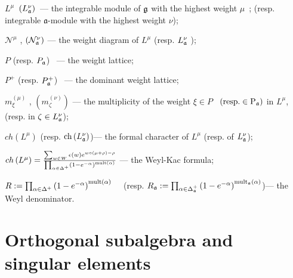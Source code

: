 \documentclass[12pt]{article}
\theoremstyle{definition}
\newcommand{\af}{\mathfrak{a}}
\begin{document}
$L^{\mu }$\ $\left( L_{\frak{a}}^{\nu }\right) $\ --- the integrable module
of $\frak{g}$ with the highest weight $\mu $\ ; (resp. integrable $\af$-module
with the highest weight $\nu $);

$\mathcal{N}^{\mu }$ , $\left( \mathcal{N}_{\frak{a}}^{\nu }\right) $ ---
the weight diagram of $L^{\mu }$ (resp. ${}L_{\frak{a}}^{\nu }$ );

$P$ (resp. $P_{\frak{a}} $) \ --- the weight lattice;

$P^{+}$ (resp. $P_{\frak{a}}^{+} $) \ --- the dominant weight lattice;

$m_{\xi }^{\left( \mu \right) }$ , $\left( m_{\zeta }^{\left( \nu \right)
}\right) $ --- the multiplicity of the weight $\xi \in P$ \ $\left( \mathrm{{%
resp. }\in P_{\frak{a}}}\right) $ in $L^{\mu }$, (resp. in $\zeta \in
L_{\frak{a}}^{\nu } $);

$ch\left( L^{\mu }\right) $ (resp. $\mathrm{ch}\left( L_{\frak{a}}^{\nu
}\right) $)--- the formal character of $L^{\mu }$ (resp. of $L_{\frak{a}}^{\nu
} $);

$ch\left( L^{\mu }\right) =\frac{\sum_{w\in W}\epsilon (w)e^{w\circ (\mu
+\rho )-\rho }}{\prod_{\alpha \in \Delta ^{+}}\left( 1-e^{-\alpha }\right) ^{%
\mathrm{{mult}\left( \alpha \right) }}}$ --- the Weyl-Kac formula;

$R:=\prod_{\alpha \in \Delta ^{+}}\left( 1-e^{-\alpha }\right) ^{\mathrm{{%
mult}\left( \alpha \right) }}\quad $ (resp. $R_{\frak{a}}:=\prod_{\alpha \in
\Delta _{\frak{a}}^{+}}\left( 1-e^{-\alpha }\right) ^{\mathrm{mult}_{\frak{a}%
}\left( \alpha \right) } $)--- the Weyl denominator.

\section{Orthogonal subalgebra and\\ singular elements}

\label{sec:recurr-form-branch}
\end{document}
